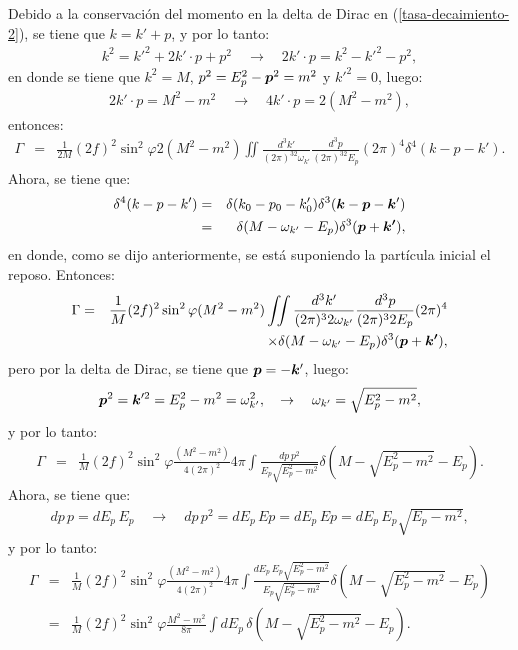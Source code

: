 Debido a la conservación del momento en la delta de Dirac en (\ref{tasa-decaimiento-2}), se tiene que $k=k'+p$, y por lo tanto:
\begin{eqnarray*}
k^2=k'^2+2k'\cdot p+p^2 \quad \rightarrow \quad 2k'\cdot p=k^2-k'^2-p^2,
\end{eqnarray*}
en donde se tiene que $k^2=M$, $p^2=E_p^2-\boldsymbol{p}^2=m^2$ y $k'^2=0$, luego:
\begin{eqnarray*}
2k'\cdot p=M^2-m^2 \quad \rightarrow \quad 4k'\cdot p=2(M^2-m^2),
\end{eqnarray*}
entonces:
\begin{eqnarray*}
\Gamma&=&\frac{1}{2M}(2f)^2\sin^2\varphi
2(M^2-m^2)\iint\frac{d^3k'}{(2\pi)^32\omega_{k'}}\frac{d^3p}{(2\pi)^32E_p}(2\pi)^4\delta^4(k-p-k').
\end{eqnarray*}
Ahora, se tiene que:
\begin{eqnarray*}
\delta^4(k-p-k')&=&\delta(k_0-p_0-k'_0)\delta^3(\boldsymbol{k}-\boldsymbol{p}-\boldsymbol{k}') \\
&=&\delta(M-\omega_{k'}-E_p)\delta^3(\boldsymbol{p}+\boldsymbol{k'}),
\end{eqnarray*}
en donde, como se dijo anteriormente, se está suponiendo la partícula inicial el reposo. Entonces:
\begin{eqnarray*}
\Gamma&=&\frac{1}{M}(2f)^2\sin^2\varphi(M^2-m^2)\iint\frac{d^3k'}{(2\pi)^32\omega_{k'}}\frac{d^3p}{(2\pi)^32E_p}(2\pi)^4\\
& &\times\delta(M-\omega_{ k'}-E_p)\delta^3(\boldsymbol{p}+\boldsymbol{k'}),
\end{eqnarray*}
pero por la delta de Dirac, se tiene que $\boldsymbol{p}=-\boldsymbol{k}'$, luego:
\begin{eqnarray*}
\boldsymbol{p}^2=\boldsymbol{k}'^2=E_p^2-m^2=\omega_{k'}^2, \quad \rightarrow \quad \omega_{k'}=\sqrt{E_p^2-m^2},
\end{eqnarray*}
y por lo tanto:
\begin{eqnarray*}
\Gamma&=&\frac{1}{M}(2f)^2\sin^2\varphi\frac{(M^2-m^2)}{4(2\pi)^2}4\pi\int\frac{dp\,p^2
}{E_p\sqrt{E_p^2-m^2}}\delta(M-\sqrt{E_p^2-m^2} -E_p).
\end{eqnarray*}
Ahora, se tiene que:
\begin{eqnarray*}
dp\,p=dE_p\,E_p \quad \rightarrow \quad dp\,p^2=dE_p\,Ep=dE_p\,Ep=dE_p\,E_p\sqrt{E_p-m^2},
\end{eqnarray*}
y por lo tanto:
\begin{eqnarray*}
\Gamma&=&\frac{1}{M}(2f)^2\sin^2\varphi\frac{(M^2-m^2)}{4(2\pi)^2}4\pi\int\frac{dE_p\,E_p\sqrt{E_p^2-m^2}}{E_p\sqrt{E_p^2-m^2}}
\delta(M-\sqrt { E_p^2-m^2 } -E_p)\\
&=&\frac{1}{M}(2f)^2\sin^2\varphi\frac{M^2-m^2}{8\pi}\int dE_p\,\delta(M-\sqrt{E_p^2-m^2}-E_p).
\end{eqnarray*}

